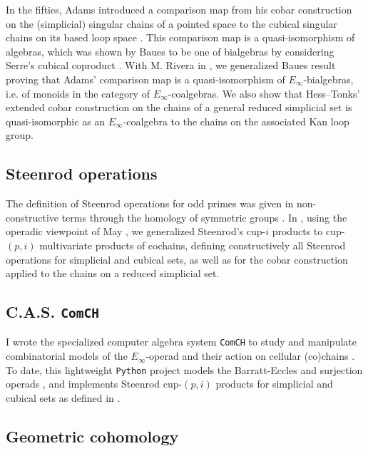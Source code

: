 In the fifties, Adams introduced a comparison map from his cobar construction on the (simplicial) singular chains of a pointed space to the cubical singular chains on its based loop space \cite{adams1956cobar}.
This comparison map is a quasi-isomorphism of algebras, which was shown by Baues to be one of bialgebras by considering Serre's cubical coproduct \cite{baues1998hopf}.
With M. Rivera in \cite{medina2021cobar}, we generalized Baues result proving that Adams' comparison map is a quasi-isomorphism of $E_{\infty}$-bialgebras, i.e. of monoids in the category of $E_{\infty}$-coalgebras.
We also show that Hess--Tonks' extended cobar construction \cite{hess2010cobar} on the chains of a general reduced simplicial set is quasi-isomorphic as an $E_{\infty}$-coalgebra to the chains on the associated Kan loop group.

\subsection{Steenrod operations} \label{ss:may steenrod}

The definition of Steenrod operations for odd primes was given in non-constructive terms through the homology of symmetric groups \cite{steenrod1952reduced, steenrod1962cohomology}.
In \cite{medina2021maysteenrod}, using the operadic viewpoint of May \cite{may1970general}, we generalized Steenrod's cup-$i$ products to cup-$(p,i)$ multivariate products of cochains, defining constructively all Steenrod operations for simplicial and cubical sets, as well as for the cobar construction applied to the chains on a reduced simplicial set.

\subsection{C.A.S. \texttt{ComCH}}

I wrote the specialized computer algebra system \texttt{ComCH} to study and manipulate combinatorial models of the $E_\infty$-operad and their action on cellular (co)chains \cite{medina2021computer}.
To date, this lightweight \texttt{Python} project models the Barratt-Eccles and surjection operads \cite{mcclure2003multivariable,berger2004combinatorial}, and implements Steenrod cup-$(p,i)$ products for simplicial and cubical sets as defined in \cite{medina2021maysteenrod}.

\subsection{Geometric cohomology} \label{ss:flows}

